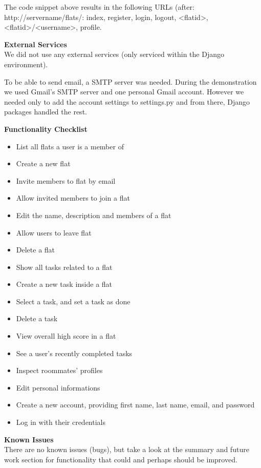 \documentclass{sig-alt-release2}
\begin{document}
The code snippet above results in the following URLs (after:
http://servername/flats/: index, register, login, logout, <flatid>,
<flatid>/<username>, profile.

\vspace{5 mm}
\noindent \textbf{External Services}\\
We did not use any external services (only serviced within the
Django environment).

To be able to send email, a SMTP server was needed. During the demonstration we
used Gmail's SMTP server and one personal Gmail account.
However we needed only to add the account settings to settings.py and from
there, Django packages handled the rest.

\vspace{5 mm}
\noindent \textbf{Functionality Checklist}\\
\begin{itemize}
\item List all flats a user is a member of
\item Create a new flat
\item Invite members to flat by email
\item Allow invited members to join a flat 
\item Edit the name, description and members of a flat
\item Allow users to leave flat
\item Delete a flat
\item Show all tasks related to a flat
\item Create a new task inside a flat
\item Select a task, and set a task as done
\item Delete a task
\item View overall high score in a flat
\item See a user's recently completed tasks
\item Inspect roommates' profiles
\item Edit personal informations
\item Create a new account, providing first name, last name, email, and password
\item Log in with their credentials
\end{itemize}

\noindent \textbf{Known Issues} \\
There are no known issues (bugs), but take a look at the summary and future work
section for functionality that could and perhaps should be improved.
\end{document}
